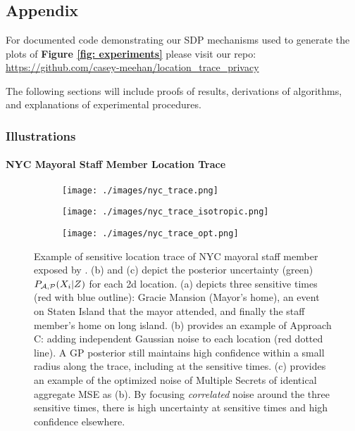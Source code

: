 \graphicspath{{./chapters/chapter5/}}
\chapter{ }

\section{Appendix}
For documented code demonstrating our SDP mechanisms used to generate the plots of \textbf{Figure \ref{fig: experiments}} please visit our repo: \url{https://github.com/casey-meehan/location_trace_privacy} 

The following sections will include proofs of results, derivations of algorithms, and explanations of experimental procedures. 
\subsection{Illustrations}
\label{apx: Illustrations}

\subsubsection{NYC Mayoral Staff Member Location Trace}

\begin{figure*}[h]
	\centering
	\begin{subfigure}[b]{.32\textwidth}
		\centering
		\texttt{[image: ./images/nyc\_trace.png]}
		\caption{}
		\label{fig:nyc_trace}
	\end{subfigure}
	\begin{subfigure}[b]{.32\textwidth}
		\centering
		\texttt{[image: ./images/nyc\_trace\_isotropic.png]}
		\caption{}
		\label{fig:nyc_trace_iso}
	\end{subfigure}
	\begin{subfigure}[b]{.32\textwidth}
		\centering
		\texttt{[image: ./images/nyc\_trace\_opt.png]}
		\caption{}
		\label{fig:nyc_trace_opt}
	\end{subfigure}
	\caption[Example of sensitive location trace of NYC mayoral staff member exposed by \citep{nyt}.]{Example of sensitive location trace of NYC mayoral staff member exposed by \citep{nyt}. (b) and (c) depict the posterior uncertainty (green) $P_{\mathcal{A},\mathcal{P}}(X_i | Z)$ for each 2d location. (a) depicts three sensitive times (red with blue outline): Gracie Mansion (Mayor's home), an event on Staten Island that the mayor attended, and finally the staff member's home on long island. (b) provides an example of Approach C: adding independent Gaussian noise to each location (red dotted line). A GP posterior still maintains high confidence within a small radius along the trace, including at the sensitive times. (c) provides an example of the optimized noise of Multiple Secrets of identical aggregate MSE as (b). By focusing \textit{correlated} noise around the three sensitive times, there is high uncertainty at sensitive times and high confidence elsewhere.}
	\label{fig:nyc_example}
\end{figure*}


